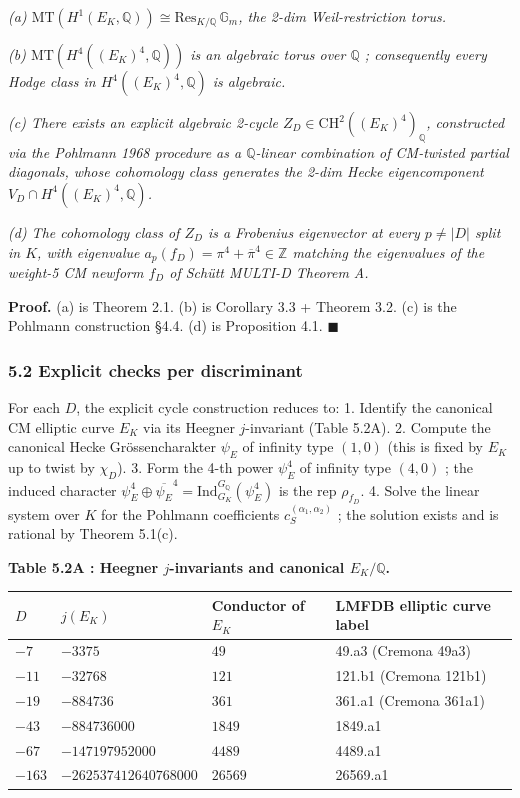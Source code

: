 \documentclass[
  11pt,
  a4paper,
]{article}
\begin{document}
\emph{(a) \(\mathrm{MT}(H^1(E_K, \mathbb{Q})) \cong \mathrm{Res}_{K/\mathbb{Q}}\,\mathbb{G}_m\), the 2-dim Weil-restriction torus.}

\emph{(b) \(\mathrm{MT}(H^4((E_K)^4, \mathbb{Q}))\) is an algebraic torus over \(\mathbb{Q}\) ; consequently every Hodge class in \(H^4((E_K)^4, \mathbb{Q})\) is algebraic.}

\emph{(c) There exists an explicit algebraic 2-cycle \(Z_D \in \mathrm{CH}^2((E_K)^4)_\mathbb{Q}\), constructed via the Pohlmann 1968 procedure as a \(\mathbb{Q}\)-linear combination of CM-twisted partial diagonals, whose cohomology class generates the 2-dim Hecke eigencomponent \(V_D \cap H^4((E_K)^4, \mathbb{Q})\).}

\emph{(d) The cohomology class of \(Z_D\) is a Frobenius eigenvector at every \(p \neq |D|\) split in \(K\), with eigenvalue \(a_p(f_D) = \pi^4 + \overline{\pi}^4 \in \mathbb{Z}\) matching the eigenvalues of the weight-5 CM newform \(f_D\) of Schütt MULTI-D Theorem A.}

\textbf{Proof.} (a) is Theorem 2.1. (b) is Corollary 3.3 + Theorem 3.2. (c) is the Pohlmann construction §4.4. (d) is Proposition 4.1. \(\blacksquare\)

\hypertarget{explicit-checks-per-discriminant}{%
\subsubsection{5.2 Explicit checks per discriminant}\label{explicit-checks-per-discriminant}}

For each \(D\), the explicit cycle construction reduces to:
1. Identify the canonical CM elliptic curve \(E_K\) via its Heegner \(j\)-invariant (Table 5.2A).
2. Compute the canonical Hecke Grössencharakter \(\psi_E\) of infinity type \((1, 0)\) (this is fixed by \(E_K\) up to twist by \(\chi_D\)).
3. Form the 4-th power \(\psi_E^4\) of infinity type \((4, 0)\) ; the induced character \(\psi_E^4 \oplus \overline{\psi_E}^4 = \mathrm{Ind}_{G_K}^{G_\mathbb{Q}}(\psi_E^4)\) is the rep \(\rho_{f_D}\).
4. Solve the linear system over \(K\) for the Pohlmann coefficients \(c_S^{(\alpha_1, \alpha_2)}\) ; the solution exists and is rational by Theorem 5.1(c).

\textbf{Table 5.2A : Heegner \(j\)-invariants and canonical \(E_K / \mathbb{Q}\).}

\begin{longtable}[]{@{}llll@{}}
\toprule\noalign{}
\(D\) & \(j(E_K)\) & Conductor of \(E_K\) & LMFDB elliptic curve label \\
\midrule\noalign{}
\endhead
\bottomrule\noalign{}
\endlastfoot
\(-7\) & \(-3375\) & \(49\) & 49.a3 (Cremona 49a3) \\
\(-11\) & \(-32768\) & \(121\) & 121.b1 (Cremona 121b1) \\
\(-19\) & \(-884736\) & \(361\) & 361.a1 (Cremona 361a1) \\
\(-43\) & \(-884736000\) & \(1849\) & 1849.a1 \\
\(-67\) & \(-147197952000\) & \(4489\) & 4489.a1 \\
\(-163\) & \(-262537412640768000\) & \(26569\) & 26569.a1 \\
\end{longtable}
\end{document}
